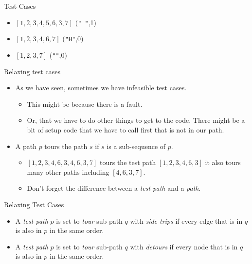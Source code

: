 \documentclass[handout]{beamer}
\newcommand{\recordingpause}{
\begin{frame}{Recording Pause}
  \begin{center}
    Recording Pause
  \end{center}
\end{frame}
}
\renewcommand{\recordingpause}{}
\begin{document}
\begin{frame}{Test Cases}
  \begin{itemize}
  \item $[1,2,3,4,5,6,3,7]$  ({\tt " "},1)
  \item $[1,2,3,4,6,7]$    ({\tt "H"},0)
  \item $[1,2,3,7]$       ({\tt ""},0)
  \end{itemize}
  \end{frame}

\recordingpause

\begin{frame}{Relaxing test cases}
  \begin{itemize}
  \item As we have seen, sometimes we have infeasible test cases.
    \begin{itemize}
    \item This might be because there is a fault.
    \item Or, that we have to do other things to get to the
      code. There might be a bit of setup code that we have to call
      first that is not in our path.
    \end{itemize}
  \item A path $p$ tours the path $s$ if $s$ is a sub-sequence of $p$.
    \begin{itemize}
    \item $[1,2,3,4,6,3,4,6,3,7]$ tours  the test path $[1,2,3,4,6,3]$ it
      also tours many other paths including $[4,6,3,7]$. 
    \item Don't forget the difference between a {\it test path} and a {\it path}.
    \end{itemize}
  \end{itemize}
    
\end{frame}
\begin{frame}{Relaxing Test Cases}
  \begin{itemize}
  \item A {\it test path} $p$ is set to {\em tour} sub-path $q$ with {\em
      side-trips} if every edge that is in $q$ is also in $p$ in the
    same order.
  \item A {\it test path} $p$ is set to {\em tour} sub-path $q$ with {\em
      detours} if every node that is in $q$ is also in $p$ in the
    same order.
  \end{itemize}
  
\end{frame}
\end{document}
